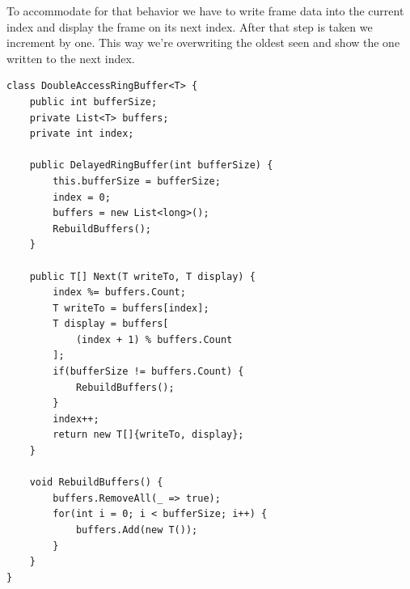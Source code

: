 To accommodate for that behavior we have to write frame data into the current 
index and display the frame on its next index. After that step is taken we 
increment by one. This way we’re overwriting the oldest seen 
 and show the one written to the next index.

\begin{lstlisting}[language={[Sharp]C}]
class DoubleAccessRingBuffer<T> {
	public int bufferSize;
	private List<T> buffers;
	private int index;
	
	public DelayedRingBuffer(int bufferSize) {
		this.bufferSize = bufferSize;
		index = 0;
		buffers = new List<long>();
		RebuildBuffers();
	}
	
	public T[] Next(T writeTo, T display) {
		index %= buffers.Count;
		T writeTo = buffers[index];
		T display = buffers[
			(index + 1) % buffers.Count
		];
		if(bufferSize != buffers.Count) {
			RebuildBuffers();
		}
		index++;
		return new T[]{writeTo, display};
	}
	
	void RebuildBuffers() {
		buffers.RemoveAll(_ => true);
		for(int i = 0; i < bufferSize; i++) {
			buffers.Add(new T());
		}
	}
}
\end{lstlisting}